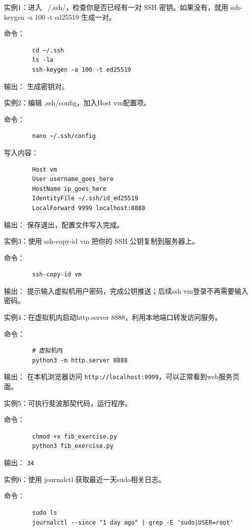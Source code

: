 \documentclass[a4paper,12pt]{ctexart}
\begin{document}
	实例1：进入 ~/.ssh/，检查你是否已经有一对 SSH 密钥。如果没有，就用 ssh-keygen -a 100 -t ed25519 生成一对。
	
	命令：
	\begin{lstlisting}
		cd ~/.ssh
		ls -la
		ssh-keygen -a 100 -t ed25519
	\end{lstlisting}
	
	输出：
	生成密钥对。
	
	实例2：编辑 .ssh/config，加入Host vm配置项。
	
	命令：
	\begin{lstlisting}
		nano ~/.ssh/config
	\end{lstlisting}
	写入内容：
	\begin{lstlisting}
		Host vm
		User username_goes_here
		HostName ip_goes_here
		IdentityFile ~/.ssh/id_ed25519
		LocalForward 9999 localhost:8888
	\end{lstlisting}
	
	输出：
	保存退出，配置文件写入完成。
	
	实例3：使用 ssh-copy-id vm 把你的 SSH 公钥复制到服务器上。
	
	命令：
	\begin{lstlisting}
		ssh-copy-id vm
	\end{lstlisting}
	
	输出：
	提示输入虚拟机用户密码，完成公钥推送；后续ssh vm登录不再需要输入密码。
	
	实例4：在虚拟机内启动http.server 8888，利用本地端口转发访问服务。
	
	命令：
	\begin{lstlisting}
		# 虚拟机内
		python3 -m http.server 8888
	\end{lstlisting}
	
	输出：
	在本机浏览器访问 \texttt{http://localhost:9999}，可以正常看到web服务页面。
	
	实例5：可执行斐波那契代码，运行程序。
	
	命令：
	\begin{lstlisting}
		chmod +x fib_exercise.py
		python3 fib_exercise.py
	\end{lstlisting}
	
	输出：
	\texttt{34}
	
	实例6：使用 journalctl 获取最近一天sudo相关日志。
	
	命令：
	\begin{lstlisting}
		sudo ls
		journalctl --since "1 day ago" | grep -E 'sudo|USER=root'
	\end{lstlisting}
	
\end{document}
